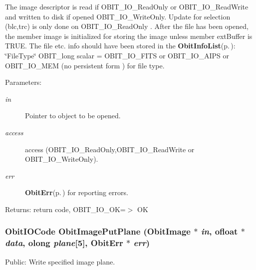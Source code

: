 The image descriptor is read if OBIT\_\-IO\_\-Read\-Only or OBIT\_\-IO\_\-Read\-Write and written to disk if opened OBIT\_\-IO\_\-Write\-Only. Update for selection (blc,trc) is only done on OBIT\_\-IO\_\-Read\-Only . After the file has been opened, the member image is initialized for storing the image unless member ext\-Buffer is TRUE. The file etc. info should have been stored in the {\bf Obit\-Info\-List}{\rm (p.\,\pageref{structObitInfoList})}: \char`\"{}File\-Type\char`\"{} OBIT\_\-long scalar = OBIT\_\-IO\_\-FITS or OBIT\_\-IO\_\-AIPS or OBIT\_\-IO\_\-MEM (no persistent form ) for file type. \begin{Desc}
\item[Parameters:]
\begin{description}
\item[{\em in}]Pointer to object to be opened. \item[{\em access}]access (OBIT\_\-IO\_\-Read\-Only,OBIT\_\-IO\_\-Read\-Write or OBIT\_\-IO\_\-Write\-Only). \item[{\em err}]{\bf Obit\-Err}{\rm (p.\,\pageref{structObitErr})} for reporting errors. \end{description}
\end{Desc}
\begin{Desc}
\item[Returns:]return code, OBIT\_\-IO\_\-OK=$>$ OK \end{Desc}
\subsubsection{\setlength{\rightskip}{0pt plus 5cm}Obit\-IOCode Obit\-Image\-Put\-Plane ({\bf Obit\-Image} $\ast$ {\em in}, {\bf ofloat} $\ast$ {\em data}, {\bf olong} {\em plane}[5], {\bf Obit\-Err} $\ast$ {\em err})}\label{ObitImage_8h_a34}


Public: Write specified image plane. 

